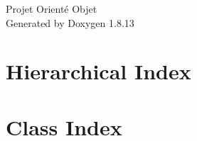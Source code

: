 \documentclass[twoside]{book}
\newcommand{\+}{\discretionary{\mbox{\scriptsize$\hookleftarrow$}}{}{}}
\newcommand{\clearemptydoublepage}{%
  \newpage{\pagestyle{empty}\cleardoublepage}%
}
\begin{document}
\hypersetup{pageanchor=false,
             bookmarksnumbered=true,
             pdfencoding=unicode
            }
\begin{titlepage}
\vspace*{7cm}
\begin{center}%
{\Large Projet Orienté Objet }\\
\vspace*{1cm}
{\large Generated by Doxygen 1.8.13}\\
\end{center}
\end{titlepage}
\clearemptydoublepage
{}
\tableofcontents
\clearemptydoublepage
{}
\hypersetup{pageanchor=true}

\chapter{Hierarchical Index}

\chapter{Class Index}

\end{document}
